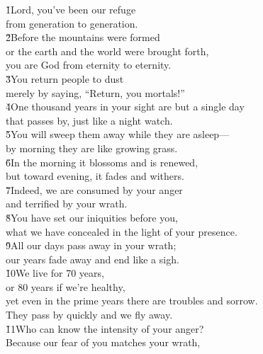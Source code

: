 \begin{poetry}
\poeml \v{1}Lord, you've been our refuge \\
\poemll    from generation to generation. \\
\poeml \v{2}Before the mountains were formed \\
\poemll    or the earth and the world were brought forth, \\
\poemlll       you are God from eternity to eternity. \\
\poeml \v{3}You return people to dust \\
\poemll    merely by saying, ``Return, you mortals!'' \\
\poeml \v{4}One thousand years in your sight are but a single day \\
\poemll    that passes by, just like a night watch. \\
\poeml \v{5}You will sweep them away while they are asleep--- \\
\poemll    by morning they are like growing grass. \\
\poeml \v{6}In the morning it blossoms and is renewed, \\
\poemll    but toward evening, it fades and withers. \\
\poeml \v{7}Indeed, we are consumed by your anger \\
\poemll    and terrified by your wrath. \\
\poeml \v{8}You have set our iniquities before you, \\
\poemll    what we have concealed in the light of your presence. \\
\poeml \v{9}All our days pass away in your wrath; \\
\poemll    our years fade away and end like a sigh. \\
\poeml \v{10}We live for 70 years, \\
\poemll    or 80 years if we're healthy, \\
\poeml yet even in the prime years there are troubles and sorrow. \\
\poemll    They pass by quickly and we fly away. \\
\poeml \v{11}Who can know the intensity of your anger? \\
\poemll    Because our fear of you matches your wrath, \\

\end{poetry}

